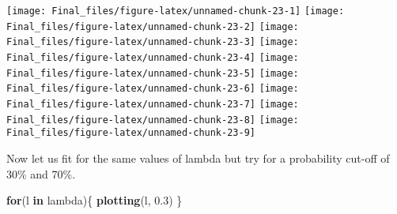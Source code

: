 \documentclass[]{article}
\newenvironment{Shaded}{\begin{snugshade}}{\end{snugshade}}
\newcommand{\CommentTok}[1]{\textcolor[rgb]{0.56,0.35,0.01}{\textit{#1}}}
\newcommand{\ControlFlowTok}[1]{\textcolor[rgb]{0.13,0.29,0.53}{\textbf{#1}}}
\newcommand{\DecValTok}[1]{\textcolor[rgb]{0.00,0.00,0.81}{#1}}
\newcommand{\FloatTok}[1]{\textcolor[rgb]{0.00,0.00,0.81}{#1}}
\newcommand{\KeywordTok}[1]{\textcolor[rgb]{0.13,0.29,0.53}{\textbf{#1}}}
\newcommand{\NormalTok}[1]{#1}
\newcommand{\OperatorTok}[1]{\textcolor[rgb]{0.81,0.36,0.00}{\textbf{#1}}}
\newcommand{\StringTok}[1]{\textcolor[rgb]{0.31,0.60,0.02}{#1}}
\begin{document}
\begin{Shaded}
\end{Shaded}

\begin{center}\texttt{[image: Final\_files/figure-latex/unnamed-chunk-23-1]} \texttt{[image: Final\_files/figure-latex/unnamed-chunk-23-2]} \texttt{[image: Final\_files/figure-latex/unnamed-chunk-23-3]} \texttt{[image: Final\_files/figure-latex/unnamed-chunk-23-4]} \texttt{[image: Final\_files/figure-latex/unnamed-chunk-23-5]} \texttt{[image: Final\_files/figure-latex/unnamed-chunk-23-6]} \texttt{[image: Final\_files/figure-latex/unnamed-chunk-23-7]} \texttt{[image: Final\_files/figure-latex/unnamed-chunk-23-8]} \texttt{[image: Final\_files/figure-latex/unnamed-chunk-23-9]} \end{center}

Now let us fit for the same values of lambda but try for a probability
cut-off of 30\% and 70\%.

\begin{Shaded}
\begin{Highlighting}[]
\ControlFlowTok{for}\NormalTok{(l }\ControlFlowTok{in}\NormalTok{ lambda)\{}
  \KeywordTok{plotting}\NormalTok{(l, }\FloatTok{0.3}\NormalTok{)}
\NormalTok{\}}
\end{Highlighting}
\end{Shaded}
\end{document}
